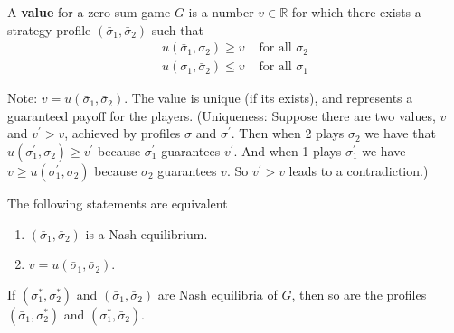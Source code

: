 \documentclass[11pt]{elegantbook}
\begin{document}
\begin{definition}
    \normalfont
    A \textbf{value} for a zero-sum game $G$ is a number $v \in \mathbb{R}$ for which there exists a strategy profile $\left(\bar{\sigma}_1, \bar{\sigma}_2\right)$ such that
    $$
    \begin{matrix}u\left(\bar{\sigma}_1, \sigma_2\right) \geq v & \text { for all } \sigma_2 \\ u\left(\sigma_1, \bar{\sigma}_2\right) \leq v & \text { for all } \sigma_1\end{matrix}
    $$
\end{definition}
Note: $v=u\left(\bar{\sigma}_1, \bar{\sigma}_2\right)$.
The value is unique (if its exists), and represents a guaranteed payoff for the players.
(Uniqueness: Suppose there are two values, $v$ and $v^{\prime}>v$, achieved by profiles $\sigma$ and $\sigma^{\prime}$. Then when 2 plays $\sigma_2$ we have that $u\left(\sigma_1^{\prime}, \sigma_2\right) \geq v^{\prime}$ because $\sigma_1^{\prime}$ guarantees $v^{\prime}$. And when 1 plays $\sigma_1^{\prime}$ we have $v \geq u\left(\sigma_1^{\prime}, \sigma_2\right)$ because $\sigma_2$ guarantees $v$. So $v^{\prime}>v$ leads to a contradiction.)

\begin{proposition}
    The following statements are equivalent
    \begin{enumerate}
        \item $\left(\bar{\sigma}_1, \bar{\sigma}_2\right)$ is a Nash equilibrium.
        \item $v=u\left(\bar{\sigma}_1, \bar{\sigma}_2\right)$.
    \end{enumerate}
\end{proposition}


\begin{corollary}
    If $\left(\sigma_1^*, \sigma_2^*\right)$ and $\left(\bar{\sigma}_1, \bar{\sigma}_2\right)$ are Nash equilibria of $G$, then so are the profiles $\left(\bar{\sigma}_1, \sigma_2^*\right)$ and $\left(\sigma_1^*, \bar{\sigma}_2\right)$.
\end{corollary}
\end{document}
